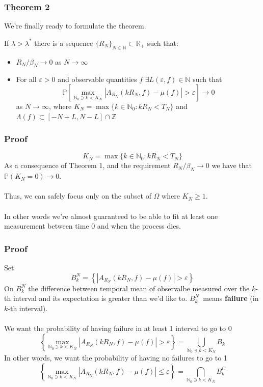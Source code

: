 \documentclass{beamer}
\begin{document}
\begin{frame}
    \frametitle{Theorem 2}

    We're finally ready to formulate the theorem.

    \begin{theorem}[Thermalization]
        If $\lambda > \lambda^*$ there is a sequence $\{R_N\}_{N \in \mathbb{N}} \subset \mathbb{R_+}$ such that:
        \begin{itemize}
            \item $R_N/\beta_N \rightarrow 0$ as $N\rightarrow \infty$
            \item For all $\varepsilon > 0$ and observable quantities $f$ $\exists L(\varepsilon, f) \in \mathbb{N}$ such that
                  \[
                      \mathbb{P}\left[ \max_{\mathbb{N}_0 \ni k < K_N}|A_{R_N}(kR_N, f) - \mu(f)| > \varepsilon\right] \rightarrow 0
                  \]
                  as $N \rightarrow \infty$, where $K_N = \max\{k \in \mathbb{N}_0: kR_N < T_N\}$ and $\Lambda(f) \subset [-N + L, N - L] \cap \mathbb{Z}$
        \end{itemize}
    \end{theorem}
\end{frame}

\begin{frame}
    \frametitle{Proof}
    \[K_N = \max\{k \in \mathbb{N}_0: kR_N < T_N\}\]
    As a consequence of Theorem 1, and the requirement $R_N/\beta_N \rightarrow 0$ we have that
    $\mathbb{P}(K_N = 0) \rightarrow 0$.  \\~\\

    Thus, we can safely focus only on the subset of $\Omega$ where $K_N \geq 1$. \\~\\

    In other words we're almost guaranteed to be able to fit at least one measurement between time $0$ and when the process dies.
\end{frame}

\begin{frame}
    \frametitle{Proof}
    Set 
    \[B^N_k = \left\{ |A_{R_N}(kR_N, f) - \mu(f)| > \varepsilon\right\}\]
    On $B^N_k$ the difference between temporal mean of observalbe measured over the $k$-th interval and its expectation is greater than we'd like to.
    $B^N_k$~means \textbf{failure} (in $k$-th interval).
    \\~\\
    We want the probability of having failure in at least 1 interval to go to 0
    \[\left\{\max_{\mathbb{N}_0 \ni k < K_N}|A_{R_N}(kR_N, f) - \mu(f)| > \varepsilon  \right\} = \bigcup_{\mathbb{N}_0 \ni k < K_N}B_k \]
    In other words, we want the probability of having no failures to go to 1
    \[\left\{\max_{\mathbb{N}_0 \ni k < K_N}|A_{R_N}(kR_N, f) - \mu(f)| \leq \varepsilon  \right\} = \bigcap_{\mathbb{N}_0 \ni k < K_N}B_k^C \]
\end{frame}
\end{document}
